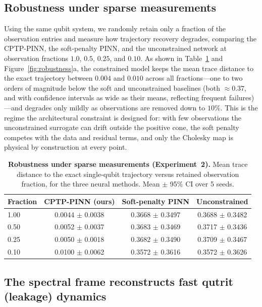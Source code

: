 \documentclass[11pt]{article}
\begin{document}
\subsection{Robustness under sparse measurements}
\label{sec:experiment_sparse}

Using the same qubit system, we randomly retain only a fraction of the observation entries and measure how trajectory recovery degrades, comparing the CPTP-PINN, the soft-penalty PINN, and the unconstrained network at observation fractions $1.0$, $0.5$, $0.25$, and $0.10$. As shown in Table~\ref{tab:exp2} and Figure~\ref{fig:robustness}a, the constrained model keeps the mean trace distance to the exact trajectory between $0.004$ and $0.010$ across all fractions---one to two orders of magnitude below the soft and unconstrained baselines (both $\approx0.37$, and with confidence intervals as wide as their means, reflecting frequent failures)---and degrades only mildly as observations are removed down to $10\%$. This is the regime the architectural constraint is designed for: with few observations the unconstrained surrogate can drift outside the positive cone, the soft penalty competes with the data and residual terms, and only the Cholesky map is physical by construction at every point.

\begin{table}[ht]
\centering
\caption{\textbf{Robustness under sparse measurements (Experiment~2).} Mean trace distance to the exact single-qubit trajectory versus retained observation fraction, for the three neural methods. Mean $\pm$ 95\% CI over 5 seeds.}
\label{tab:exp2}
\begin{tabular}{lccc}
\toprule
Fraction & CPTP-PINN (ours) & Soft-penalty PINN & Unconstrained \\
\midrule
1.00 & 0.0044 $\pm$ 0.0038 & 0.3668 $\pm$ 0.3497 & 0.3688 $\pm$ 0.3482 \\
0.50 & 0.0052 $\pm$ 0.0037 & 0.3683 $\pm$ 0.3469 & 0.3717 $\pm$ 0.3436 \\
0.25 & 0.0050 $\pm$ 0.0018 & 0.3682 $\pm$ 0.3490 & 0.3709 $\pm$ 0.3467 \\
0.10 & 0.0100 $\pm$ 0.0062 & 0.3572 $\pm$ 0.3616 & 0.3572 $\pm$ 0.3626 \\
\bottomrule
\end{tabular}
\end{table}

\subsection{The spectral frame reconstructs fast qutrit (leakage) dynamics}
\label{sec:experiment_qutrit}
\end{document}

